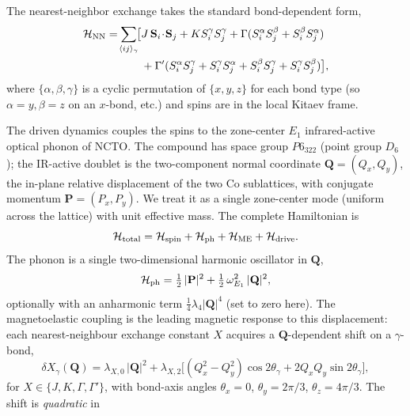 \documentclass[aps,prb,twocolumn,superscriptaddress,floatfix,nofootinbib]{revtex4-2}
\begin{document}
The nearest-neighbor exchange takes the standard bond-dependent form,
\begin{equation}
\begin{split}
\mathcal{H}_{\rm NN}=\!\sum_{\langle ij\rangle_\gamma}\!\bigl[
  &J\,\mathbf{S}_i\!\cdot\!\mathbf{S}_j +K S_i^\gamma S_j^\gamma
  +\Gamma(S_i^\alpha S_j^\beta+S_i^\beta S_j^\alpha) \\
  &+\Gamma'(S_i^\alpha S_j^\gamma+S_i^\gamma S_j^\alpha
           +S_i^\beta  S_j^\gamma+S_i^\gamma S_j^\beta)\bigr],
\end{split}
\label{eq:HNN}
\end{equation}
where $\{\alpha,\beta,\gamma\}$ is a cyclic permutation of $\{x,y,z\}$ for each
bond type (so $\alpha=y,\beta=z$ on an $x$-bond, etc.) and spins are in the local
Kitaev frame.

The driven dynamics couples the spins to the zone-center $E_1$ infrared-active
optical phonon of NCTO.  The compound has space group $P6_322$ (point group
$D_6$); the IR-active doublet is the two-component normal coordinate
$\mathbf{Q}=(Q_x,Q_y)$, the in-plane relative displacement of the two Co
sublattices, with conjugate momentum $\mathbf{P}=(P_x,P_y)$.  We treat it as a
single zone-center mode (uniform across the lattice) with unit effective mass.
The complete Hamiltonian is
\begin{equation}
\mathcal{H}_{\rm total}
  = \mathcal{H}_{\rm spin}
  + \mathcal{H}_{\rm ph}
  + \mathcal{H}_{\rm ME}
  + \mathcal{H}_{\rm drive}.
\label{eq:Htotal}
\end{equation}
The phonon is a single two-dimensional harmonic oscillator in $\mathbf{Q}$,
\begin{equation}
\mathcal{H}_{\rm ph}
  = \tfrac12\,|\mathbf{P}|^2 + \tfrac12\,\omega_{E_1}^2\,|\mathbf{Q}|^2 ,
\label{eq:Hph}
\end{equation}
optionally with an anharmonic term $\tfrac14\lambda_4|\mathbf{Q}|^4$ (set to
zero here).  The magnetoelastic coupling is the leading magnetic response to
this displacement: each nearest-neighbour exchange constant $X$ acquires a
$\mathbf{Q}$-dependent shift on a $\gamma$-bond,
\begin{equation}
\delta X_\gamma(\mathbf{Q})
  = \lambda_{X,0}\,|\mathbf{Q}|^2
  + \lambda_{X,2}\big[(Q_x^2-Q_y^2)\cos2\theta_\gamma
                      + 2 Q_x Q_y \sin2\theta_\gamma\big],
\label{eq:dX}
\end{equation}
for $X\in\{J,K,\Gamma,\Gamma'\}$, with bond-axis angles $\theta_x=0$,
$\theta_y=2\pi/3$, $\theta_z=4\pi/3$.  The shift is \emph{quadratic} in
\end{document}
